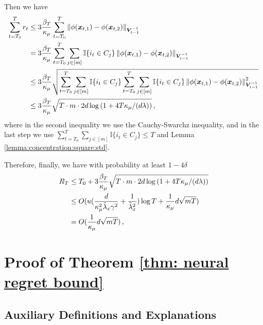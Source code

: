 Then we have
\begin{align}
    \sum_{t=T_0}^T r_t &\leq 3 \frac{\beta_T}{\kappa_\mu}\sum_{t=T_0}^T\left\| \phi(\boldsymbol{x}_{t,1}) - \phi(\boldsymbol{x}_{t,2}) \right\|_{\boldsymbol{V}_{t-1}^{-1}}\notag\\
    &=3 \frac{\beta_T}{\kappa_\mu}\sum_{t=T_0}^T\sum_{j\in[m]}\mathbb{I}\{i_t\in C_j\}\left\| \phi(\boldsymbol{x}_{t,1}) - \phi(\boldsymbol{x}_{t,2}) \right\|_{\boldsymbol{V}_{t-1}^{-1}}\notag\\
    &\leq 3 \frac{\beta_T}{\kappa_\mu}\sqrt{\sum_{t=T_0}^T\sum_{j\in[m]}\mathbb{I}\{i_t\in C_j\}\sum_{t=T_0}^T\sum_{j\in[m]}\mathbb{I}\{i_t\in C_j\}\left\| \phi(\boldsymbol{x}_{t,1}) - \phi(\boldsymbol{x}_{t,2}) \right\|_{\boldsymbol{V}_{t-1}^{-1}}^2}\notag\\
    &\leq 3 \frac{\beta_T}{\kappa_\mu}\sqrt{T\cdot m\cdot 2 d\log \left( 1 + 4T \kappa_{\mu}/(d\lambda) \right)}\,,
\end{align}
where in the second inequality we use the Cauchy-Swarchz inequality, and in the last step we use $\sum_{t=T_0}^T\sum_{j\in[m]}\mathbb{I}\{i_t\in C_j\}\leq T$ and Lemma \ref{lemma:concentration:square:std}.

Therefore, finally, we have with probability at least $1-4\delta$
\begin{align}
    R_T & \leq T_0+ 3 \frac{\beta_T}{\kappa_\mu}\sqrt{T\cdot m\cdot 2 d\log \left( 1 + 4T \kappa_{\mu}/(d\lambda) \right)}\notag\\
    &\leq O(u(\frac{d}{\kappa_\mu^2\tilde\lambda_x \gamma^2}+\frac{1}{\tilde\lambda_x^2})\log T+\frac{1}{\kappa_\mu}d\sqrt{mT})\notag\\
        &=O(\frac{1}{\kappa_\mu}d\sqrt{mT})\,,
\end{align}


\section{Proof of Theorem \ref{thm: neural regret bound}}
\label{app: proof neural}

\subsection{Auxiliary Definitions and Explanations}
\label{app:subsec:aux:defs}

